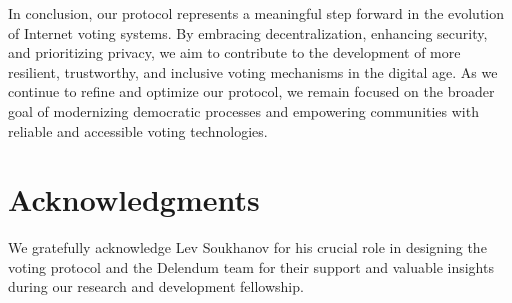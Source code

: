 \documentclass[runningheads]{llncs}
\begin{document}
In conclusion, our protocol represents a meaningful step forward in the evolution of Internet voting systems. By embracing decentralization, enhancing security, and prioritizing privacy, we aim to contribute to the development of more resilient, trustworthy, and inclusive voting mechanisms in the digital age. As we continue to refine and optimize our protocol, we remain focused on the broader goal of modernizing democratic processes and empowering communities with reliable and accessible voting technologies.

\section{Acknowledgments}
We gratefully acknowledge Lev Soukhanov for his crucial role in designing the voting protocol and the Delendum team for their support and valuable insights during our research and development fellowship.



\end{document}
